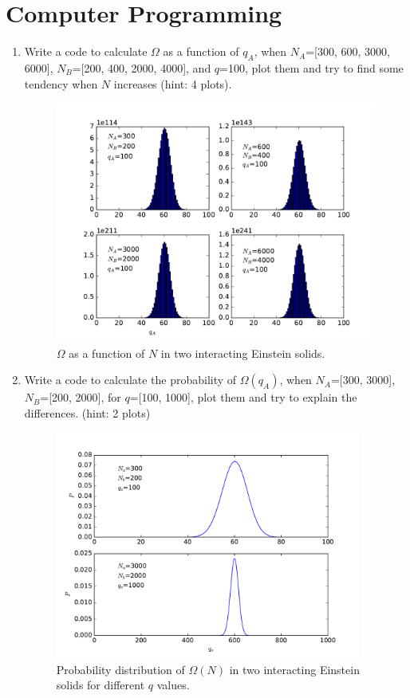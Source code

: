 \section{Computer Programming}
\begin{enumerate}
\item Write a code to calculate $\Omega$ as a function of $q_A$, when $N_A$=[300, 600, 3000, 6000], $N_B$=[200, 400, 2000, 4000],
and $q$=100, plot them and try to find some tendency when $N$ increases (hint: 4 plots).
\begin{figure}[h]
\centering
\includegraphics[width=12cm]{imgs/Einstein.pdf}
\caption{$\Omega$ as a function of $N$ in two interacting Einstein solids. }
\end{figure}
\item Write a code to calculate the probability of $\Omega(q_A)$, when $N_A$=[300, 3000], $N_B$=[200, 2000],
for $q$=[100, 1000], plot them and try to explain the differences. (hint: 2 plots)

\begin{figure}[h]
\centering
\includegraphics[width=10cm]{imgs/Einstein2.pdf}
\caption{Probability distribution of $\Omega(N)$ in two interacting Einstein solids for different $q$ values. }
\end{figure}


\end{enumerate}
